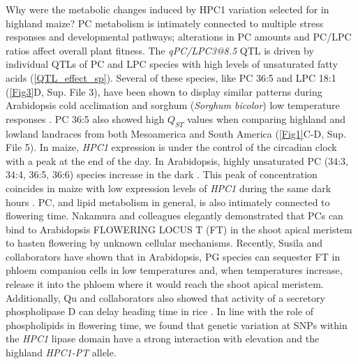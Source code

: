 \documentclass[9pt,twocolumn,twoside,lineno]{biorxiv}
\newcommand{\hpc}{\textit{HPC1}\xspace}
\begin{document}
Why were the metabolic changes induced by HPC1 variation selected for in highland maize?
PC metabolism is intimately connected to multiple stress responses and developmental pathways; alterations in PC amounts and PC/LPC ratios affect overall plant fitness.
The \textit{qPC/LPC3@8.5} QTL is driven by individual QTLs of PC and LPC species with high levels of unsaturated fatty acids (\cref{QTL_effect_sp}).
Several of these species, like PC 36:5 and LPC 18:1 (\cref{Fig3}D, Sup. File 3), have been shown to display similar patterns during Arabidopsis cold acclimation \cite{Welti2002-uk} and sorghum (\textit{Sorghum bicolor}) low temperature responses \cite{Marla2017-ph}.
PC 36:5 also showed high $Q_{ST}$ values when comparing highland and lowland landraces from both Mesoamerica and South America (\cref{Fig1}C-D, Sup. File 5).
In maize, \hpc expression is under the control of the circadian clock \cite{Khan2010-iv} with a peak at the end of the day. 
In Arabidopsis, highly unsaturated PC (34:3, 34:4, 36:5, 36:6) species increase in the dark \cite{Maatta2012-ip}. 
This peak of concentration coincides in maize with low expression levels of \hpc during the same dark hours \cite{Khan2010-iv}.
PC, and lipid metabolism in general, is also intimately connected to flowering time. 
Nakamura and colleagues elegantly demonstrated that PCs can bind to Arabidopsis FLOWERING LOCUS T (FT) in the shoot apical meristem to hasten flowering \cite{Nakamura2014-qf, Nakamura2019-ht} by unknown cellular mechanisms. 
Recently, Susila and collaborators have shown that in Arabidopsis, PG species can sequester FT in phloem companion cells in low temperatures \cite{Susila2021-dz} and, when temperatures increase, release it into the phloem where it would reach the shoot apical meristem.   
Additionally, Qu and collaborators also showed that activity of a secretory phospholipase D can delay heading time in rice \cite{Qu2021-wc}.
In line with the role of phospholipids in flowering time, we found that genetic variation at SNPs within the  \hpc lipase domain have a strong interaction with elevation and the highland \textit{HPC1-PT} allele. 
\end{document}
